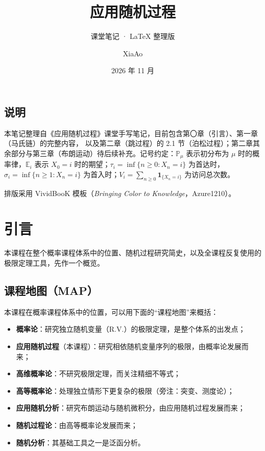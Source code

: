 \documentclass[lang=cn,10pt,newtx,thmcnt=chapter,mode=simple]{vividbook}
\title{应用随机过程}
\subtitle{课堂笔记 · LaTeX 整理版}
\author{XiaAo}
\date{2026 年 11 月}
\makeatletter
\providecommand{\E}{}\renewcommand{\E}{\mathbb{E}}
\providecommand{\Pp}{}\renewcommand{\Pp}{\mathbb{P}}
\newcommand{\ind}[1]{\mathbf{1}_{\{#1\}}}
\newcommand{\chapterheadfix}[1]{\vspace*{1.2cm}\markboth{\xchaptertitle\ #1}{}}
\theoremstyle{vividthm}
\theoremstyle{vividdef}
\theoremstyle{vividexa}
\theoremstyle{vividrem}
\renewcommand\tableofcontents{%
  \hypersetup{linktoc=all, linkcolor=black}%
  \chapter*{\contentsname
    \@mkboth{\MakeUppercase\contentsname}{\MakeUppercase\contentsname}}%
  \vspace*{0.9cm}%
  \@starttoc{toc}%
  \hypersetup{linkcolor=winered}%
}
\makeatother
\begin{document}
\maketitle

\frontmatter
\section*{说明}

本笔记整理自《应用随机过程》课堂手写笔记，目前包含第〇章（引言）、第一章（马氏链）的完整内容，
以及第二章（跳过程）的 2.1 节（泊松过程）；第二章其余部分与第三章（布朗运动）待后续补充。记号约定：$\Pp_\mu$ 表示初分布为
$\mu$ 时的概率律，$\E_i$ 表示 $X_0=i$ 时的期望；$\tau_i=\inf\{n\ge 0:X_n=i\}$ 为首达时，
$\sigma_i=\inf\{n\ge 1:X_n=i\}$ 为首入时；$V_i=\sum_{n\ge0}\ind{X_n=i}$ 为访问总次数。

\noindent 排版采用 VividBooK 模板（\emph{Bringing Color to Knowledge}，Azure1210）。

\clearpage
\tableofcontents

\mainmatter
\setcounter{chapter}{-1}

\chapter{引言}
\chapterheadfix{引言}

本课程在整个概率课程体系中的位置、随机过程研究简史，以及全课程反复使用的极限定理工具，先作一个概览。

\section{课程地图（MAP）}

本课程在概率课程体系中的位置，可以用下面的“课程地图”来概括：

\begin{itemize}
  \item \textbf{概率论}：研究独立随机变量（R.V.）的极限定理，是整个体系的出发点；
  \item \textbf{应用随机过程}（本课程）：研究相依随机变量序列的极限，由概率论发展而来；
  \item \textbf{高维概率论}：不研究极限定理，而关注精细不等式；
  \item \textbf{高等概率论}：处理独立情形下更复杂的极限（旁注：突变、测度论）；
  \item \textbf{应用随机分析}：研究布朗运动与随机微积分，由应用随机过程发展而来；
  \item \textbf{随机过程论}：由高等概率论发展而来；
  \item \textbf{随机分析}：其基础工具之一是泛函分析。
\end{itemize}
\end{document}
